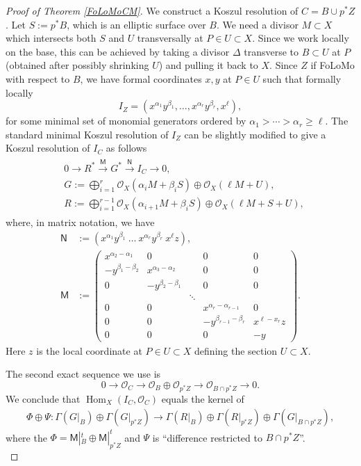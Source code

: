 \documentclass{amsart}
\theoremstyle{definition}
\renewcommand{\O}{\mathcal{O}}
\newcommand{\Hom}{\operatorname{Hom}}
\begin{document}
\begin{proof}[Proof of Theorem \ref{FoLoMoCM}]
We construct a Koszul resolution of $C = B \cup p^* Z$. Let $S:= p^*B$, which is an elliptic surface over $B$. We need a divisor $M \subset X$ which intersects both $S$ and $U$ transversally at $P \in U \subset X$. Since we work locally on the base, this can be achieved by taking a divisor $\Delta$ transverse to $B \subset U$ at $P$ (obtained after possibly shrinking $U$) and pulling it back to $X$. Since $Z$ if FoLoMo with respect to $B$, we have formal coordinates $x,y$ at $P \in U$ such that formally locally
\[
I_Z = (x^{\alpha_1} y^{\beta_1}, \ldots, x^{\alpha_r} y^{\beta_r},x^{\ell}),
\] 
for some minimal set of monomial generators ordered by $\alpha_1 > \cdots > \alpha_r \geq \ell$. The standard minimal Koszul resolution of $I_Z$ can be slightly modified to give a Koszul resolution of $I_C$ as follows
\begin{align}
\begin{split} \label{Koszul}
&0 \longrightarrow R^* \stackrel{\mathsf{M}}{\longrightarrow} G^* \stackrel{\mathsf{N}}{\longrightarrow} I_C \longrightarrow 0, \\
&G:= \bigoplus_{i=1}^{r} \O_X(\alpha_i M + \beta_i S) \oplus \O_X(\ell M + U), \\
&R := \bigoplus_{i=1}^{r-1} \O_X(\alpha_{i+1} M +\beta_i S) \oplus \O_X(\ell M + S + U),
\end{split}
\end{align}
where, in matrix notation, we have
\begin{align*}
\mathsf{N}&:=(x^{\alpha_1} y^{\beta_1} \  \ldots \  x^{\alpha_r} y^{\beta_r} \ x^\ell z), \\
\mathsf{M}&:= \left( \begin{array}{ccccc} x^{\alpha_2 - \alpha_1} & 0 & & 0 & 0 \\ -y^{\beta_1 - \beta_2} & x^{\alpha_3 - \alpha_2} & & 0 & 0 \\ 0 & -y^{\beta_2 - \beta_1} & & 0 & 0 \\  &  & \ddots &  &  \\ 0 & 0 & & x^{\alpha_{r} - \alpha_{r-1}} & 0 \\ 0 & 0 & & -y^{\beta_{r-1} - \beta_r} & x^{\ell - x_r} z \\ 0 & 0 & & 0 & -y \end{array} \right).
\end{align*}
Here $z$ is the local coordinate at $P \in U \subset X$ defining the section $U \subset X$. 

The second exact sequence we use is
\[
0 \longrightarrow \O_C \longrightarrow \O_{B} \oplus \O_{p^*Z} \longrightarrow \O_{B \cap p^*Z} \longrightarrow 0.
\]
We conclude that $\Hom_X(I_C,\O_C)$ equals the kernel of 
\begin{align*}
\Phi \oplus \Psi : \Gamma(G|_B) \oplus \Gamma(G|_{p^*Z}) \longrightarrow \Gamma(R|_B) \oplus \Gamma(R|_{p^*Z})\oplus \Gamma(G|_{B \cap p^*Z}),
\end{align*}
where the $\Phi = \mathsf{M}|_B^t \oplus \mathsf{M}|_{p^*Z}^t$ and $\Psi$ is ``difference restricted to $B \cap p^*Z$''. \\


\end{proof}
\end{document}
